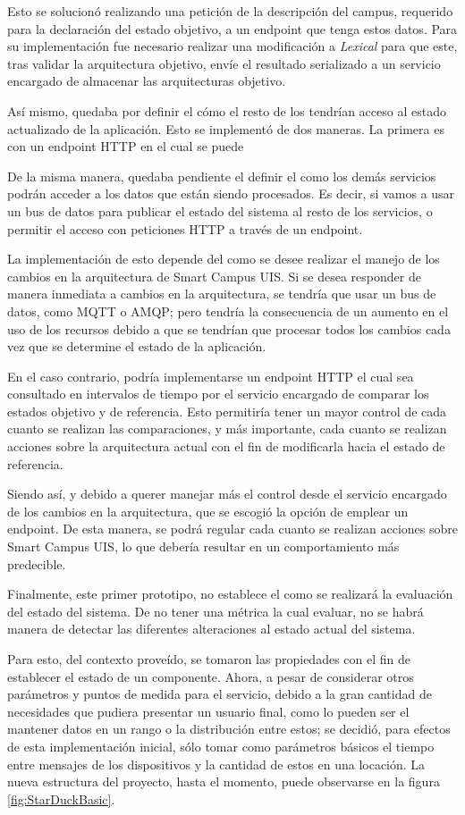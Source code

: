Esto se solucionó realizando una petición de la descripción del campus, requerido para la declaración del estado objetivo, a un endpoint que tenga estos datos. Para su implementación fue necesario realizar una modificación a \textit{Lexical} para que este, tras validar la arquitectura objetivo, envíe el resultado serializado a un servicio encargado de almacenar las arquitecturas objetivo. 

Así mismo, quedaba por definir el cómo el resto de los tendrían acceso al estado actualizado de la aplicación. Esto se implementó de dos maneras. La primera es con un endpoint HTTP en el cual se puede 

% 
De la misma manera, quedaba pendiente el definir el como los demás servicios podrán acceder a los datos que están siendo procesados. Es decir, si vamos a usar un bus de datos para publicar el estado del sistema al resto de los servicios, o permitir el acceso con peticiones HTTP a través de un endpoint.

% 
La implementación de esto depende del como se desee realizar el manejo de los cambios en la arquitectura de Smart Campus UIS. Si se desea responder de manera inmediata a cambios en la arquitectura, se tendría que usar un bus de datos, como MQTT o AMQP; pero tendría la consecuencia de un aumento en el uso de los recursos debido a que se tendrían que procesar todos los cambios cada vez que se determine el estado de la aplicación. 

% 
En el caso contrario, podría implementarse un endpoint HTTP el cual sea consultado en intervalos de tiempo por el servicio encargado de comparar los estados objetivo y de referencia. Esto permitiría tener un mayor control de cada cuanto se realizan las comparaciones, y más importante, cada cuanto se realizan acciones sobre la arquitectura actual con el fin de modificarla hacia el estado de referencia.

Siendo así, y debido a querer manejar más el control desde el servicio encargado de los cambios en la arquitectura, que se escogió la opción de emplear un endpoint. De esta manera, se podrá regular cada cuanto se realizan acciones sobre Smart Campus UIS, lo que debería resultar en un comportamiento más predecible.

Finalmente, este primer prototipo, no establece el como se realizará la evaluación del estado del sistema. De no tener una métrica la cual evaluar, no se habrá manera de detectar las diferentes alteraciones al estado actual del sistema.

Para esto, del contexto proveído, se tomaron las propiedades con el fin de establecer el estado de un componente. Ahora, a pesar de considerar otros parámetros y puntos de medida para el servicio, debido a la gran cantidad de necesidades que pudiera presentar un usuario final, como lo pueden ser el mantener datos en un rango o la distribución entre estos; se decidió, para efectos de esta implementación inicial, sólo tomar como parámetros básicos el tiempo entre mensajes de los dispositivos y la cantidad de estos en una locación. La nueva estructura del proyecto, hasta el momento, puede observarse en la figura \ref{fig:StarDuckBasic}.
 
